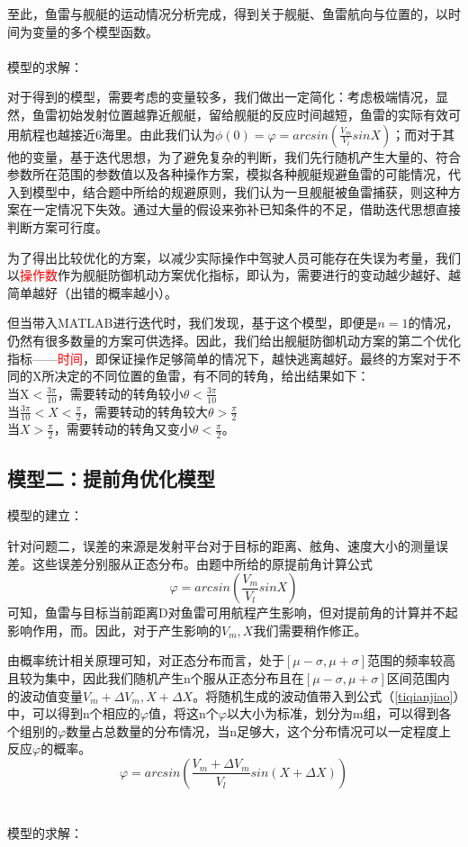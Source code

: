 \documentclass[12pt]{article}%
\begin{document}
至此，鱼雷与舰艇的运动情况分析完成，得到关于舰艇、鱼雷航向与位置的，以时间为变量的多个模型函数。\\\ \\
模型的求解：

对于得到的模型，需要考虑的变量较多，我们做出一定简化：考虑极端情况，显然，鱼雷初始发射位置越靠近舰艇，留给舰艇的反应时间越短，鱼雷的实际有效可用航程也越接近6海里。由此我们认为$\phi(0)=\varphi=arcsin\left(\frac{V_m}{V_l}sinX\right)$；而对于其他的变量，基于迭代思想，为了避免复杂的判断，我们先行随机产生大量的、符合参数所在范围的参数值以及各种操作方案，模拟各种舰艇规避鱼雷的可能情况，代入到模型中，结合题中所给的规避原则，我们认为一旦舰艇被鱼雷捕获，则这种方案在一定情况下失效。通过大量的假设来弥补已知条件的不足，借助迭代思想直接判断方案可行度。

为了得出比较优化的方案，以减少实际操作中驾驶人员可能存在失误为考量，我们以\textcolor{red}{操作数}作为舰艇防御机动方案优化指标，即认为，需要进行的变动越少越好、越简单越好（出错的概率越小）。

但当带入MATLAB进行迭代时，我们发现，基于这个模型，即便是$n=1$的情况，仍然有很多数量的方案可供选择。因此，我们给出舰艇防御机动方案的第二个优化指标——\textcolor{red}{时间}，即保证操作足够简单的情况下，越快逃离越好。最终的方案对于不同的X所决定的不同位置的鱼雷，有不同的转角，给出结果如下：\\
当X$<\frac{3\pi}{10}$，需要转动的转角较小$\theta<\frac{3\pi}{10}$\\
当$\frac{3\pi}{10}<X<\frac{\pi}{2}$，需要转动的转角较大$\theta>\frac{\pi}{2}$\\
当$X>\frac{\pi}{2}$，需要转动的转角又变小$\theta<\frac{\pi}{2}$。
\subsection{模型二：提前角优化模型}
模型的建立：

针对问题二，误差的来源是发射平台对于目标的距离、舷角、速度大小的测量误差。这些误差分别服从正态分布。由题中所给的原提前角计算公式
\begin{equation}\label{tiqianjiao}
\varphi=arcsin\left(\frac{V_m}{V_l}sinX\right)
\end{equation}
可知，鱼雷与目标当前距离D对鱼雷可用航程产生影响，但对提前角的计算并不起影响作用，而。因此，对于产生影响的$V_m,X$我们需要稍作修正。

由概率统计相关原理可知，对正态分布而言，处于$[\mu-\sigma ,\mu+\sigma]$范围的频率较高且较为集中，因此我们随机产生n个服从正态分布且在$[\mu-\sigma ,\mu+\sigma]$区间范围内的波动值变量$V_m+\Delta V_m,X+\Delta X$。将随机生成的波动值带入到公式（\ref{tiqianjiao}）中，可以得到n个相应的$\varphi$值，将这n个$\varphi$以大小为标准，划分为m组，可以得到各个组别的$\varphi$数量占总数量的分布情况，当n足够大，这个分布情况可以一定程度上反应$\varphi$的概率。
\begin{equation}\label{tiqianjiao2}
\varphi=arcsin\left(\frac{V_m+\Delta V_m}{V_l}sin(X+\Delta X)\right)
\end{equation}\\\ \\
模型的求解：
\end{document}
